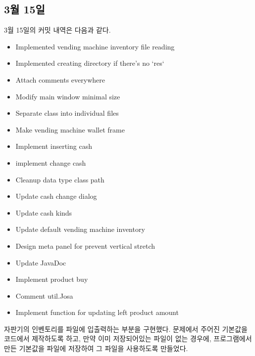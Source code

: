 \documentclass{oblivoir}
\begin{document}
    \subsection{3월 15일}

    3월 15일의 커밋 내역은 다음과 같다.

    \begin{itemize}
        \item Implemented vending machine inventory file reading
        \item Implemented creating directory if there's no `res`
        \item Attach comments everywhere
        \item Modify main window minimal size
        \item Separate class into individual files
        \item Make vending machine wallet frame
        \item Implement inserting cash
        \item implement change cash
        \item Cleanup data type class path
        \item Update cash change dialog
        \item Update cash kinds
        \item Update default vending machine inventory
        \item Design meta panel for prevent vertical stretch
        \item Update JavaDoc
        \item Implement product buy
        \item Comment util.Josa
        \item Implement function for updating left product amount
    \end{itemize}

    자판기의 인벤토리를 파일에 입출력하는 부분을 구현했다.
    문제에서 주어진 기본값을 코드에서 제작하도록 하고,
    만약 이미 저장되어있는 파일이 없는 경우에, 프로그램에서 만든 기본값을 파일에 저장하여
    그 파일을 사용하도록 만들었다.
\end{document}
